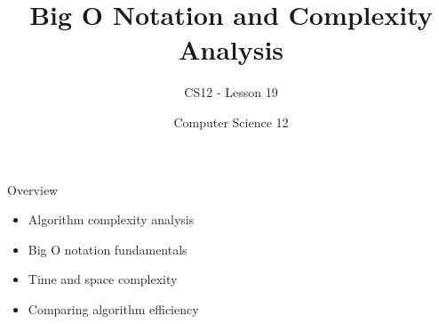 \documentclass[10pt]{beamer}
\title{Big O Notation and Complexity Analysis}
\subtitle{CS12 - Lesson 19}
\author{Computer Science 12}
\date{}
\begin{document}
\begin{frame}
    \titlepage
\end{frame}

\begin{frame}{Overview}
    \begin{itemize}
        \item Algorithm complexity analysis
        \item Big O notation fundamentals
        \item Time and space complexity
        \item Comparing algorithm efficiency
    \end{itemize}
\end{frame}

\end{document}
